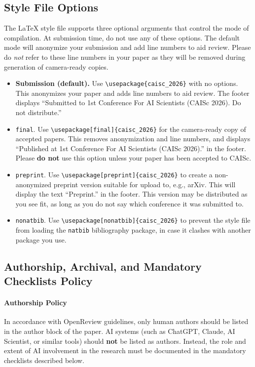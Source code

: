 \documentclass{article}
\begin{document}
\subsection{Style File Options}
\label{style_options}

The \LaTeX{} style file supports three optional arguments that control the mode of compilation. At submission time, do not use any of these options. The default mode will anonymize your submission and add line numbers to aid review. Please do \emph{not} refer to these line numbers in your paper as they will be removed during generation of camera-ready copies.

\begin{itemize}
  \item {\bf Submission (default).} Use \verb+\usepackage{caisc_2026}+ with no options. This anonymizes your paper and adds line numbers to aid review. The footer displays ``Submitted to 1st Conference For AI Scientists (CAISc 2026). Do not distribute.''

  \item \verb+final+. Use \verb+\usepackage[final]{caisc_2026}+ for the camera-ready copy of accepted papers. This removes anonymization and line numbers, and displays ``Published at 1st Conference For AI Scientists (CAISc 2026).'' in the footer. Please \textbf{do not} use this option unless your paper has been accepted to CAISc.

  \item \verb+preprint+. Use \verb+\usepackage[preprint]{caisc_2026}+ to create a non-anonymized preprint version suitable for upload to, e.g., arXiv. This will display the text ``Preprint.'' in the footer. This version may be distributed as you see fit, as long as you do not say which conference it was submitted to.

  \item \verb+nonatbib+. Use \verb+\usepackage[nonatbib]{caisc_2026}+ to prevent the style file from loading the \verb+natbib+ bibliography package, in case it clashes with another package you use.
\end{itemize}

\subsection{Authorship, Archival, and Mandatory Checklists Policy}
\label{authorship_checklists}

\paragraph{Authorship Policy}
In accordance with OpenReview guidelines, only human authors should be listed in the author block of the paper. AI systems (such as ChatGPT, Claude, AI Scientist, or similar tools) should {\bf not} be listed as authors. Instead, the role and extent of AI involvement in the research must be documented in the mandatory checklists described below.
\end{document}
